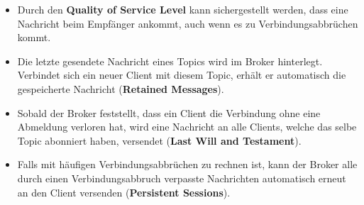 \begin{itemize}
    \item Durch den \textbf{Quality of Service Level} kann sichergestellt werden, dass eine Nachricht beim Empfänger ankommt, auch wenn es zu Verbindungsabbrüchen kommt.
    \item Die letzte gesendete Nachricht eines Topics wird im Broker hinterlegt. Verbindet sich ein neuer Client mit diesem Topic, erhält er automatisch
    die gespeicherte Nachricht (\textbf{Retained Messages}).
    \item Sobald der Broker feststellt, dass ein Client die Verbindung ohne eine Abmeldung verloren hat, wird eine Nachricht an alle Clients, welche das
    selbe Topic abonniert haben, versendet (\textbf{Last Will and Testament}).
    \item Falls mit häufigen Verbindungsabbrüchen zu rechnen ist, kann der Broker alle durch einen Verbindungsabbruch verpasste Nachrichten automatisch 
    erneut an den Client versenden (\textbf{Persistent Sessions}).
\end{itemize}


